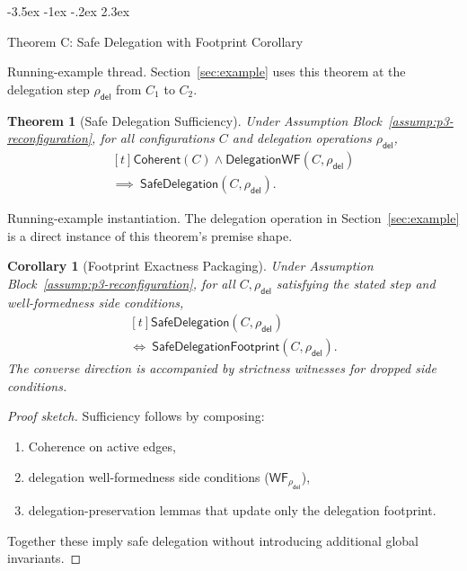 \documentclass[a4paper,10pt,twocolumn,english]{article}
\makeatletter
\renewcommand{\section}{\@startsection{section}{1}{\z@}%
  {-3.5ex \@plus -1ex \@minus -.2ex}%
  {2.3ex}%
  {\raggedright\normalfont\large\bfseries}}
\numberwithin{equation}{section}
\theoremstyle{paperdef}
\theoremstyle{paperplain}
\newtheorem{theorem}[definition]{Theorem}
\newtheorem{corollary}[definition]{Corollary}
\theoremstyle{paperdef}
\theoremstyle{paperremark}
\theoremstyle{paperdef}
\newcommand{\Coherent}{\ensuremath{\mathsf{Coherent}}}
\makeatother
\begin{document}
\section{Theorem C: Safe Delegation with Footprint Corollary}
\label{sec:theorem-c}

Running-example thread. Section~\ref{sec:example} uses this theorem at the
delegation step $\rho_{\mathsf{del}}$ from $C_1$ to $C_2$.

\begin{theorem}[Safe Delegation Sufficiency]
	\label{thm:delegation}
	Under Assumption Block~\ref{assump:p3-reconfiguration}, for all configurations $C$ and delegation operations $\rho_{\mathsf{del}}$,
	\begin{equation}
		\begin{aligned}[t]
			\Coherent(C) \land \mathsf{DelegationWF}(C,\rho_{\mathsf{del}})
			\\
			\implies\ \mathsf{SafeDelegation}(C,\rho_{\mathsf{del}}).
		\end{aligned}
	\end{equation}
\end{theorem}

Running-example instantiation. The delegation operation in
Section~\ref{sec:example} is a direct instance of this theorem's premise shape.

\begin{corollary}[Footprint Exactness Packaging]
	\label{cor:footprint}
	Under Assumption Block~\ref{assump:p3-reconfiguration}, for all $C,\rho_{\mathsf{del}}$ satisfying the stated step and well-formedness side conditions,
	\begin{equation}
		\begin{aligned}[t]
			\mathsf{SafeDelegation}(C,\rho_{\mathsf{del}})
			\\
			\iff\ \mathsf{SafeDelegationFootprint}(C,\rho_{\mathsf{del}}).
		\end{aligned}
	\end{equation}
	The converse direction is accompanied by strictness witnesses for dropped side conditions.
\end{corollary}

\begin{proof}[Proof sketch]
	Sufficiency follows by composing:
	\begin{enumerate}
		\item Coherence on active edges,
		\item delegation well-formedness side conditions ($\mathsf{WF}_{\rho_{\mathsf{del}}}$),
		\item delegation-preservation lemmas that update only the delegation footprint.
	\end{enumerate}
	Together these imply safe delegation without introducing additional global invariants.
\end{proof}
\end{document}
